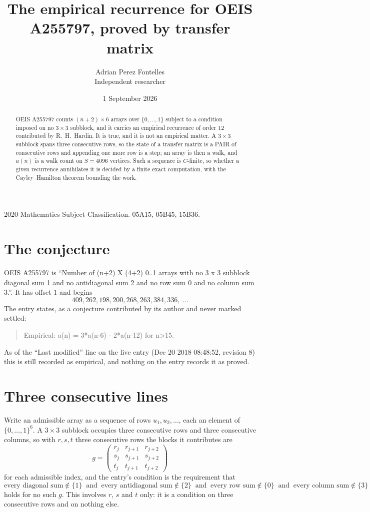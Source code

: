 \documentclass[11pt,a4paper]{article}
\title{The empirical recurrence for OEIS A255797, proved by transfer matrix}
\author{Adrian Perez Fontelles\\ \small Independent researcher}
\date{1 September 2026}
\theoremstyle{plain}
\theoremstyle{definition}
\begin{document}
\maketitle

\begin{abstract}
OEIS A255797 counts $(n+2)\times6$ arrays over $\{0,\dots,1\}$ subject to a condition imposed on
no $3\times3$ subblock, and it carries an empirical recurrence of order $12$
contributed by R.~H.~Hardin. It is true, and it is not an empirical matter. A $3\times3$
subblock spans three consecutive rows, so the state of a transfer matrix is a PAIR of
consecutive rows and appending one more row is a step; an array is then a walk, and
$a(n)$ is a walk count on $S=4096$ vertices. Such a sequence is $C$-finite, so whether a given
recurrence annihilates it is decided by a finite exact computation, with the Cayley--Hamilton
theorem bounding the work.
\end{abstract}

\noindent\small 2020 Mathematics Subject Classification. 05A15, 05B45, 15B36.\normalsize

\section{The conjecture}

OEIS A255797 is ``Number of (n+2) X (4+2) 0..1 arrays with no 3 x 3 subblock diagonal sum 1 and no antidiagonal sum 2 and no row sum 0 and no column sum 3.''. It has offset $1$ and begins
\[
409, 262, 198, 200, 268, 263, 384, 336,\ \dots
\]
The entry states, as a conjecture contributed by its author and never marked settled:
\begin{quote}
Empirical: a(n) = 3*a(n-6) - 2*a(n-12) for n>15.
\end{quote}
As of the ``Last modified'' line on the live entry (Dec 20 2018 08:48:52, revision 8) this is still
recorded as empirical, and nothing on the entry records it as proved.

\section{Three consecutive lines}

Write an admissible array as a sequence of rows $u_1,u_2,\dots$, each an element of
$\{0,\dots,1\}^{6}$. A $3\times3$ subblock occupies three consecutive rows and
three consecutive columns, so with $r,s,t$ three consecutive rows the blocks it
contributes are
\[
g=\begin{pmatrix}r_j&r_{j+1}&r_{j+2}\\ s_j&s_{j+1}&s_{j+2}\\ t_j&t_{j+1}&t_{j+2}\end{pmatrix}
\]
for each admissible index, and the entry's condition is the requirement that
\[
\text{every diagonal sum} \notin \{1\}\ \text{ and }\ \text{every antidiagonal sum} \notin \{2\}\ \text{ and }\ \text{every row sum} \notin \{0\}\ \text{ and }\ \text{every column sum} \notin \{3\}
\]
holds for no such $g$. This involves $r$, $s$ and $t$ only: it is a condition on
three consecutive rows and on nothing else.
\end{document}
